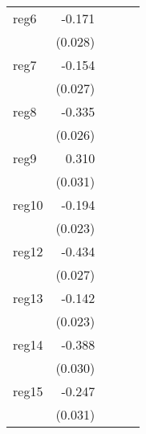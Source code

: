 {\begin{longtable}{l*{4}{D{.}{.}{-1}}}
\addlinespace
reg6        &      -0.171\sym{***}&                     &                     &                     \\
            &     (0.028)         &                     &                     &                     \\
\addlinespace
reg7        &      -0.154\sym{***}&                     &                     &                     \\
            &     (0.027)         &                     &                     &                     \\
\addlinespace
reg8        &      -0.335\sym{***}&                     &                     &                     \\
            &     (0.026)         &                     &                     &                     \\
\addlinespace
reg9        &       0.310\sym{***}&                     &                     &                     \\
            &     (0.031)         &                     &                     &                     \\
\addlinespace
reg10       &      -0.194\sym{***}&                     &                     &                     \\
            &     (0.023)         &                     &                     &                     \\
\addlinespace
reg12       &      -0.434\sym{***}&                     &                     &                     \\
            &     (0.027)         &                     &                     &                     \\
\addlinespace
reg13       &      -0.142\sym{***}&                     &                     &                     \\
            &     (0.023)         &                     &                     &                     \\
\addlinespace
reg14       &      -0.388\sym{***}&                     &                     &                     \\
            &     (0.030)         &                     &                     &                     \\
\addlinespace
reg15       &      -0.247\sym{***}&                     &                     &                     \\
            &     (0.031)         &                     &                     &                     \\

\end{longtable}}
